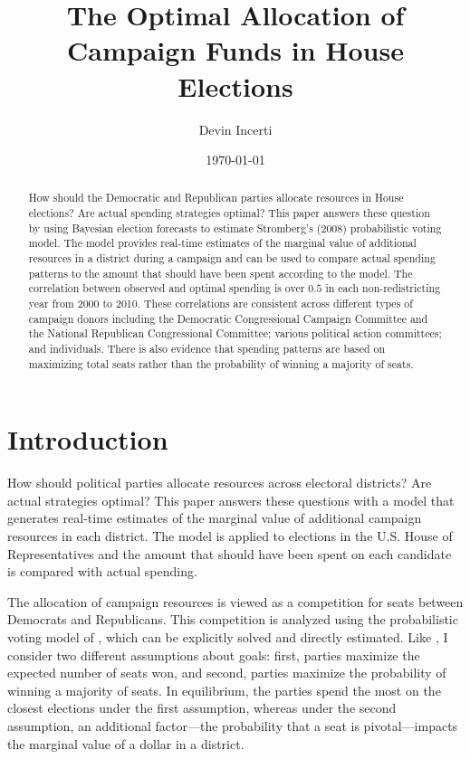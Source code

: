 \documentclass[12pt,final,fleqn]{article}
\theoremstyle{plain}
\begin{document}
\author{Devin Incerti}
\title{\textbf{The Optimal Allocation of Campaign Funds in House Elections}}
\date{\today}
\maketitle

\thispagestyle{empty}
\setcounter{page}{0}

\begin{singlespacing}
\begin{abstract}
How should the Democratic and Republican parties allocate resources in House elections? Are actual spending strategies optimal? This paper answers these question by using Bayesian election forecasts to estimate Stromberg's (2008) probabilistic voting model. The model provides real-time estimates of the marginal value of additional resources in a district during a campaign and can be used to compare actual spending patterns to the amount that should have been spent according to the model. The correlation between observed and optimal spending is over $0.5$ in each non-redistricting year from 2000 to 2010. These correlations are consistent across different types of campaign donors including the Democratic Congressional Campaign Committee and the National Republican Congressional Committee; various political action committees; and individuals. There is also evidence that spending patterns are based on maximizing total seats rather than the probability of winning a majority of seats.
\end{abstract}
\end{singlespacing}

\clearpage
\doublespacing

\section{Introduction}
How should political parties allocate resources across electoral districts? Are actual strategies optimal? This paper answers these questions with a model that generates real-time estimates of the marginal value of additional campaign resources in each district. The model is applied to elections in the U.S. House of Representatives and the amount that should have been spent on each candidate is compared with actual spending. 

The allocation of campaign resources is viewed as a competition for seats between Democrats and Republicans. This competition is analyzed using the probabilistic voting model of \citet{stromberg2008electoral}, which can be explicitly solved and directly estimated. Like \citet{snyder1989election}, I consider two different assumptions about goals: first, parties maximize the expected number of seats won, and second, parties maximize the probability of winning a majority of seats. In equilibrium, the parties spend the most on the closest elections under the first assumption, whereas under the second assumption, an additional factor---the probability that a seat is pivotal---impacts the marginal value of a dollar in a district.
\end{document}
